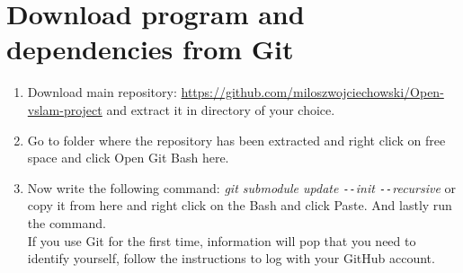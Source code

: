 \documentclass[a4paper,12pt]{book}
\begin{document}
\section{Download program and dependencies from Git}
\begin{enumerate}
	\item Download main repository: \url{https://github.com/miloszwojciechowski/Open-vslam-project} and extract it in directory of your choice.
	\item \begin{minipage}[t]{\linewidth}
		\raggedright
		\medskip	
	\end{minipage}
	Go to folder where the repository has been extracted and right click on free space and click Open Git Bash here.
	\item \begin{minipage}[t]{\linewidth}
		\raggedright
		\medskip	
	\end{minipage}
	Now write the following command: \textit{git submodule update \texttt{-{}-}init \texttt{-{}-}recursive} or copy it from here and right click on the Bash and click Paste. And lastly run the command. \\
	If you use Git for the first time, information will pop that you need to identify yourself, follow the instructions to log with your GitHub account.\\

\end{enumerate}
\end{document}
